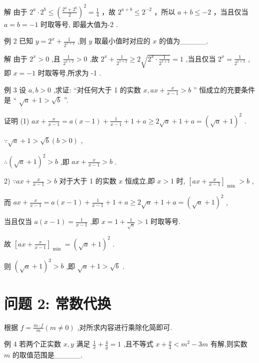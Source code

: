 \documentclass[10pt]{article}
\begin{document}
解 由于 \({2}^{a} \cdot  {2}^{b} \leq  {\left( \frac{{2}^{a} + {2}^{b}}{2}\right) }^{2} = \frac{1}{4}\) ，故 \({2}^{a + b} \leq  {2}^{-2}\) ，所以 \(a + b \leq   - 2\) ，当且仅当 \(a = b =  - 1\) 时取等号, 即最大值为-2 .

例 2 已知 \(y = {2}^{x} + \frac{1}{{2}^{x + 2}}\) ,则 \(y\) 取最小值时对应的 \(x\) 的值为\_\_\_\_\_.

解 由于 \({2}^{x} > 0\) ,且 \(\frac{1}{{2}^{x + 2}} > 0\) ,故 \({2}^{x} + \frac{1}{{2}^{x + 2}} \geq  2\sqrt{{2}^{x} \cdot  \frac{1}{{2}^{x + 2}}} = 1\) ,当且仅当 \({2}^{x} = \frac{1}{{2}^{x + 2}}\) ,即 \(x =  - 1\) 时取等号,所求为 -1 .

例 3 设 \(a,b > 0\) ,求证: “对任何大于 1 的实数 \(x,{ax} + \frac{x}{x - 1} > b\) ” 恒成立的充要条件是 “ \(\sqrt{a} + 1 > \sqrt{b}\) ”.

证明 (1) \({ax} + \frac{x}{x - 1} = a\left( {x - 1}\right)  + \frac{1}{x - 1} + 1 + a \geq  2\sqrt{a} + 1 + a = {\left( \sqrt{a} + 1\right) }^{2}\) .

\(\because \sqrt{a} + 1 > \sqrt{b}\left( {b > 0}\right)\) ,

\(\therefore {\left( \sqrt{a} + 1\right) }^{2} > b\) ,即 \({ax} + \frac{x}{x - 1} > b\) .

2) \(\because {ax} + \frac{x}{x - 1} > b\) 对于大于 1 的实数 \(x\) 恒成立,即 \(x > 1\) 时, \({\left\lbrack  ax + \frac{x}{x - 1}\right\rbrack  }_{\text{ min }} > b\) ,

而 \({ax} + \frac{x}{x - 1} = a\left( {x - 1}\right)  + \frac{1}{x - 1} + 1 + a \geq  2\sqrt{a} + 1 + a = {\left( \sqrt{a} + 1\right) }^{2}\) ,

当且仅当 \(a\left( {x - 1}\right)  = \frac{1}{x - 1}\) ,即 \(x = 1 + \frac{1}{\sqrt{a}} > 1\) 时取等号.

故 \({\left\lbrack  ax + \frac{x}{x - 1}\right\rbrack  }_{\text{ min }} = {\left( \sqrt{a} + 1\right) }^{2}\) .

则 \({\left( \sqrt{a} + 1\right) }^{2} > b\) ,即 \(\sqrt{a} + 1 > \sqrt{b}\) .

\section*{问题 2: 常数代换}

根据 \(f = \frac{m \cdot  f}{m}\left( {m \neq  0}\right)\) ,对所求内容进行乘除化简即可.

例 4 若两个正实数 \(x,y\) 满足 \(\frac{1}{x} + \frac{4}{y} = 1\) ,且不等式 \(x + \frac{y}{4} < {m}^{2} - {3m}\) 有解,则实数 \(m\) 的取值范围是\_\_\_\_\_.
\end{document}
